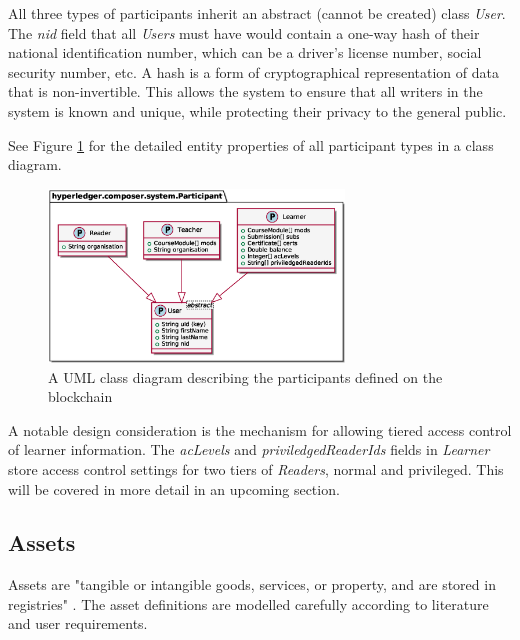 All three types of participants inherit an abstract (cannot be created) class \textit{User}. The \textit{nid} field
that all \textit{Users} must have would contain a one-way hash of their national identification number, which can be a
driver's license number, social security number, etc. A hash is a form
of cryptographical representation of data that is non-invertible. This allows the system to ensure that
all writers in the system is known and unique, while protecting their privacy to the general public.

See Figure \ref{fig:participants} for the detailed entity properties of all participant types
in a class diagram.

\begin{figure}[!ht]
	\centering
	\includegraphics[width=0.7\textwidth]{participants}
	\caption[Participants Class Diagram]
	{A UML class diagram describing the participants defined on the blockchain}
	\label{fig:participants}
\end{figure}

A notable design consideration is the mechanism for allowing tiered access control of
learner information. The \textit{acLevels} and \textit{priviledgedReaderIds} fields in \textit{Learner}
store access control settings for two tiers of \textit{Readers}, normal and privileged.
This will be covered in more detail in an upcoming section.

\subsection{Assets}

Assets are "tangible or intangible goods, services, or property, and are stored in registries" \citep{official2018composer}.
The asset definitions are modelled carefully according to literature and user requirements.

